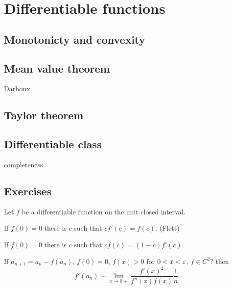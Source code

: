 \documentclass{../note}
\begin{document}
\chapter{Differentiable functions}
\section{Monotonicty and convexity}
\section{Mean value theorem}
Darboux
\section{Taylor theorem}
\section{Differentiable class}
completeness

\section*{Exercises}
\begin{prb}
Let $f$ be a differentiable function on the unit closed interval.
\begin{parts}
\item If $f(0)=0$ there is $c$ such that $cf'(c)=f(c)$. (Flett)
\item If $f(0)=0$ there is $c$ such that $cf(c)=(1-c)f'(c)$.
\end{parts}
\end{prb}

\begin{prb}
If $a_{n+1}=a_n-f(a_n)$, $f(0)=0$, $f(x)>0$ for $0<x<\varepsilon$, $f\in C^2$? then
\[f'(a_n)\sim\lim_{x\to0+}\frac{f'(x)^2}{f''(x)f(x)}\frac1n.\]
\end{prb}

\begin{pf}

\end{pf}
\end{document}
